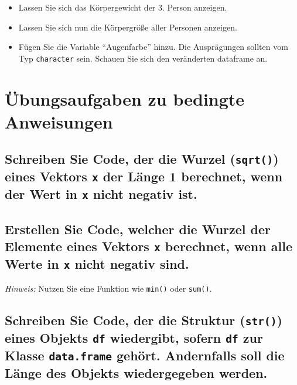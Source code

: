 \documentclass[12pt,a4paper]{article}
\begin{document}
\begin{itemize}
  \item Lassen Sie sich das Körpergewicht der 3. Person anzeigen.
  \item Lassen Sie sich nun die Körpergröße aller Personen anzeigen.
  \item Fügen Sie die Variable “Augenfarbe” hinzu. Die Ausprägungen sollten vom Typ \texttt{character} sein. Schauen Sie sich den veränderten dataframe an.
\end{itemize}

\section{Übungsaufgaben zu bedingte
Anweisungen}\label{uxfcbungsaufgaben-zu-bedingte-anweisungen}

\subsection{\texorpdfstring{Schreiben Sie Code, der die Wurzel
(\texttt{sqrt()}) eines Vektors \texttt{x} der Länge 1 berechnet, wenn
der Wert in \texttt{x} nicht negativ
ist.}{Schreiben Sie Code, der die Wurzel () eines Vektors  der Länge 1 berechnet, wenn der Wert in  nicht negativ ist.}}\label{schreiben-sie-code-der-die-wurzel-eines-vektors-der-luxe4nge-1-berechnet-wenn-der-wert-in-nicht-negativ-ist.}

\subsection{\texorpdfstring{Erstellen Sie Code, welcher die Wurzel der
Elemente eines Vektors \texttt{x} berechnet, wenn alle Werte in
\texttt{x} nicht negativ
sind.}{Erstellen Sie Code, welcher die Wurzel der Elemente eines Vektors  berechnet, wenn alle Werte in  nicht negativ sind.}}\label{erstellen-sie-code-welcher-die-wurzel-der-elemente-eines-vektors-berechnet-wenn-alle-werte-in-nicht-negativ-sind.}

\emph{Hinweis:} Nutzen Sie eine Funktion wie \texttt{min()} oder
\texttt{sum()}.

\subsection{\texorpdfstring{Schreiben Sie Code, der die Struktur
(\texttt{str()}) eines Objekts \texttt{df} wiedergibt, sofern
\texttt{df} zur Klasse \texttt{data.frame} gehört. Andernfalls soll die
Länge des Objekts wiedergegeben
werden.}{Schreiben Sie Code, der die Struktur () eines Objekts  wiedergibt, sofern  zur Klasse  gehört. Andernfalls soll die Länge des Objekts wiedergegeben werden.}}\label{schreiben-sie-code-der-die-struktur-eines-objekts-wiedergibt-sofern-zur-klasse-gehuxf6rt.-andernfalls-soll-die-luxe4nge-des-objekts-wiedergegeben-werden.}
\end{document}
